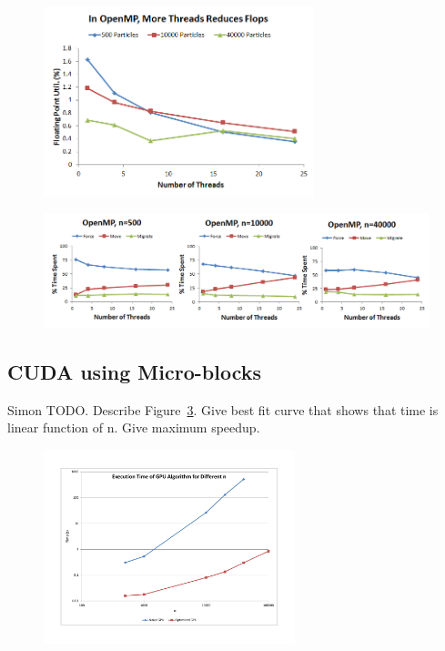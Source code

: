 \documentclass[11pt]{article} %
\begin{document}
\begin{figure}[!h]
\centering
\includegraphics[width=0.7\textwidth]{figures/openmp_mb_flops.png}
\caption{}
\label{openmp_mb_flops}
\end{figure}

\begin{figure}[!h]
\centering
\includegraphics[width=1\textwidth]{figures/openmp_mb_rtime.png}
\caption{}
\label{openmp_mb_rtime}
\end{figure}

\subsection{CUDA using Micro-blocks}

Simon TODO. Describe Figure~\ref{gpu_time_vs_n}. Give best fit curve that shows that time is linear function of n. Give maximum speedup.

\begin{figure}[!h]
\centering
\includegraphics*[width=0.65\textwidth, viewport= 70 70 730 550]{figures/gpu_time_vs_n}
\caption{}
\label{gpu_time_vs_n}
\end{figure}
\end{document}
